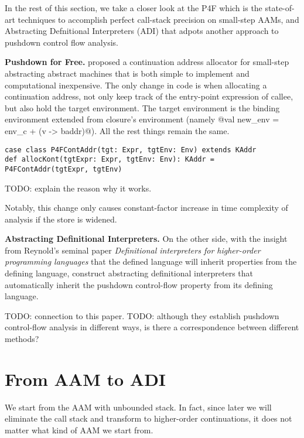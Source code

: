 \documentclass[acmsmall,review,anonymous]{acmart}\settopmatter{printfolios=true,printccs=false,printacmref=false}
\begin{document}
In the rest of this section, we take a closer look at the P4F which is the
state-of-art techniques to accomplish perfect call-stack precision on small-step
AAMs, and Abstracting Defnitional Interpreters (ADI) that adpots another 
approach to pushdown control flow analysis.

\textbf{Pushdown for Free.}
\citeauthor{gilray2016pushdown} proposed a continuation address allocator for 
small-step abstracting abstract machines that is both simple to implement and
computational inexpensive.
The only change in code is when allocating a continuation address, not only
keep track of the entry-point expression of callee, but also hold the target environment.
The target environment is the binding environment extended from closure's environment
(namely @val new_env = env_c + (v -> baddr)@). All the rest things remain the same.

\begin{lstlisting}
case class P4FContAddr(tgt: Expr, tgtEnv: Env) extends KAddr
def allocKont(tgtExpr: Expr, tgtEnv: Env): KAddr = P4FContAddr(tgtExpr, tgtEnv)
\end{lstlisting}

TODO: explain the reason why it works.

Notably, this change only causes constant-factor increase in time complexity of analysis
if the store is widened.

\textbf{Abstracting Definitional Interpreters.}
On the other side, with the insight from Reynold's seminal paper 
\emph{Definitional interpreters for higher-order programming languages} \cite{reynolds1972definitional}
that the defined language will inherit properties
from the defining language, \citeauthor{darais2017abstracting} construct abstracting 
definitional interpreters that automatically inherit the pushdown control-flow 
property from its defining language.

TODO: connection to this paper.
TODO: although they establish pushdown control-flow analysis in different ways, 
is there a correspondence between different methods?

\section{From AAM to ADI}

We start from the AAM with unbounded stack.
In fact, since later we will eliminate the call stack and transform to
higher-order continuations, it does not matter what kind of AAM we start from.
\end{document}

